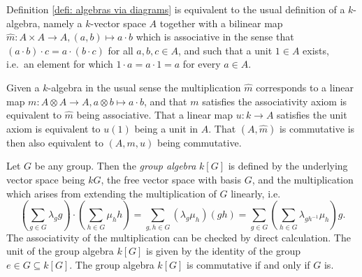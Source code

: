 \begin{rem}
 Definition \ref{defi: algebras via diagrams} is equivalent to the usual definition of a $k$-algebra, namely a $k$-vector space $A$ together with a bilinear map $\hat{m} \colon A \times A \to A, (a,b) \mapsto a \cdot b$ which is associative in the sense that $(a \cdot b) \cdot c = a \cdot (b \cdot c)$ for all $a,b,c \in A$, and such that a unit $1 \in A$ exists, i.e.\ an element for which $1 \cdot a = a \cdot 1 = a$ for every $a \in A$.
 
 Given a $k$-algebra in the usual sense the multiplication $\hat{m}$ corresponds to a linear map $m \colon A \otimes A \to A, a \otimes b \mapsto a \cdot b$, and that $m$ satisfies the associativity axiom is equivalent to $\hat{m}$ being associative. That a linear map $u \colon k \to A$ satisfies the unit axiom is equivalent to $u(1)$ being a unit in $A$. That $(A,\hat{m})$ is commutative is then also equivalent to $(A,m,u)$ being commutative.
\end{rem}


\begin{expl}
 Let $G$ be any group. Then the \emph{group algebra} $k[G]$ is defined by the underlying vector space being $kG$, the free vector space with basis $G$, and the multiplication which arises from extending the multiplication of $G$ linearly, i.e.
 \[
  \left( \sum_{g \in G} \lambda_g g \right) \cdot \left( \sum_{h \in G} \mu_h h \right)
  = \sum_{g,h \in G} (\lambda_g \mu_h) (gh)
  = \sum_{g \in G} \left( \sum_{h \in G} \lambda_{gh^{-1}} \mu_h \right) g.
 \]
 The associativity of the multiplication can be checked by direct calculation. The unit of the group algebra $k[G]$ is given by the identity of the group $e \in G \subseteq k[G]$. The group algebra $k[G]$ is commutative if and only if $G$ is.
\end{expl}


